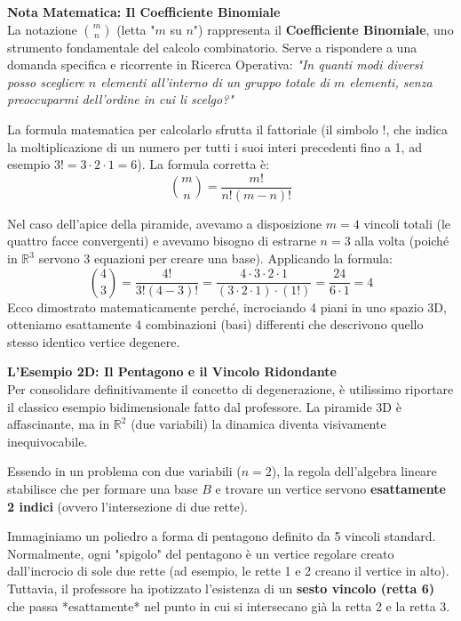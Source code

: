 \documentclass[12pt, a4paper]{article}
\begin{document}
	\vspace{0.3cm}
	\textbf{Nota Matematica: Il Coefficiente Binomiale}\\
	La notazione $\binom{m}{n}$ (letta "$m$ su $n$") rappresenta il \textbf{Coefficiente Binomiale}, uno strumento fondamentale del calcolo combinatorio. Serve a rispondere a una domanda specifica e ricorrente in Ricerca Operativa: \textit{"In quanti modi diversi posso scegliere $n$ elementi all'interno di un gruppo totale di $m$ elementi, senza preoccuparmi dell'ordine in cui li scelgo?"}
	
	La formula matematica per calcolarlo sfrutta il fattoriale (il simbolo $!$, che indica la moltiplicazione di un numero per tutti i suoi interi precedenti fino a 1, ad esempio $3! = 3 \cdot 2 \cdot 1 = 6$). La formula corretta è:
	\[
	\binom{m}{n} = \frac{m!}{n!(m-n)!}
	\]
	
	Nel caso dell'apice della piramide, avevamo a disposizione $m=4$ vincoli totali (le quattro facce convergenti) e avevamo bisogno di estrarne $n=3$ alla volta (poiché in $\mathbb{R}^3$ servono 3 equazioni per creare una base). Applicando la formula:
	\[
	\binom{4}{3} = \frac{4!}{3!(4-3)!} = \frac{4 \cdot 3 \cdot 2 \cdot 1}{(3 \cdot 2 \cdot 1) \cdot (1!)} = \frac{24}{6 \cdot 1} = 4
	\]
	Ecco dimostrato matematicamente perché, incrociando 4 piani in uno spazio 3D, otteniamo esattamente 4 combinazioni (basi) differenti che descrivono quello stesso identico vertice degenere.
	
	\vspace{0.4cm}
	\textbf{L'Esempio 2D: Il Pentagono e il Vincolo Ridondante}\\
	Per consolidare definitivamente il concetto di degenerazione, è utilissimo riportare il classico esempio bidimensionale fatto dal professore. La piramide 3D è affascinante, ma in $\mathbb{R}^2$ (due variabili) la dinamica diventa visivamente inequivocabile.
	
	Essendo in un problema con due variabili ($n=2$), la regola dell'algebra lineare stabilisce che per formare una base $B$ e trovare un vertice servono \textbf{esattamente 2 indici} (ovvero l'intersezione di due rette). 
	
	Immaginiamo un poliedro a forma di pentagono definito da 5 vincoli standard. Normalmente, ogni "spigolo" del pentagono è un vertice regolare creato dall'incrocio di sole due rette (ad esempio, le rette 1 e 2 creano il vertice in alto). 
	Tuttavia, il professore ha ipotizzato l'esistenza di un \textbf{sesto vincolo (retta 6)} che passa *esattamente* nel punto in cui si intersecano già la retta 2 e la retta 3.
	
\end{document}
